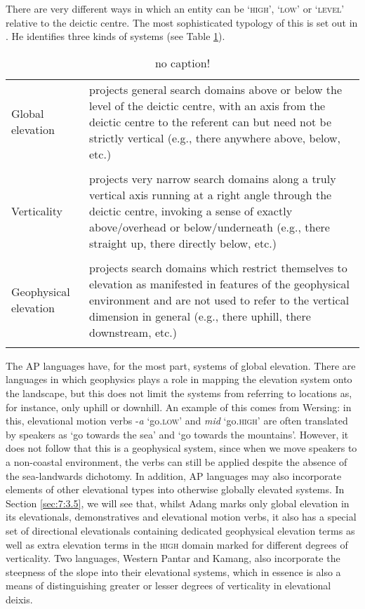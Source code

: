 \documentclass[output=paper]{LSP/langsci}
\begin{document}
There are very different ways in which an entity can be `\textsc{high}', `\textsc{low}' or `\textsc{level}' relative to the deictic centre. The most sophisticated typology of this is set out in \citet{Burenhult2008}. He identifies three kinds of systems \citep[110-111]{Burenhult2008} (see Table \ref{tab:7:1}).



\begin{table}
\begin{tabular}{p{2cm}p{8cm}}
\mytoprule
Global \newline elevation & projects general search domains above or below the level of the deictic centre, with an axis from the deictic centre to the referent can but need not be strictly vertical (e.g., there anywhere above, below, etc.)\\
\\
Verticality & projects very narrow search domains along a truly vertical axis running at a right angle through the deictic centre, invoking a sense of exactly above/overhead or below/underneath (e.g., there straight up, there directly below, etc.)\\
\\
Geophysical elevation & projects search domains which restrict themselves to elevation as manifested in features of the geophysical environment and are not used to refer to the vertical dimension in general (e.g., there uphill, there downstream, etc.)\\
\mybottomrule
\end{tabular}
\caption{no caption!}
\label{tab:7:1}
\end{table}

The AP languages have, for the most part, systems of global elevation. There are languages in which geophysics plays a role in mapping the elevation system onto the landscape, but this does not limit the systems from referring to locations as, for instance, only uphill or downhill. An example of this comes from Wersing: in this, elevational motion verbs -\textit{a} `go.\textsc{low'} and \textit{mid} `go.\textsc{high'} are often translated by speakers as `go towards the sea' and `go towards the mountains'. However, it does not follow that this is a geophysical system, since when we move speakers to a non-coastal environment, the verbs can still be applied despite the absence of the sea-landwards dichotomy. In addition, AP languages may also incorporate elements of {other elevational types into otherwise globally elevated systems. In Section \ref{sec:7:3.5}, we will see that, whilst Adang marks only global elevation in its elevationals, demonstratives and elevational motion verbs, it also has a special set of directional elevationals containing dedicated geophysical elevation terms as well as extra elevation terms in the} \textsc{high} {domain marked for different degrees of verticality. Two languages, Western Pantar and Kamang, also incorporate the steepness of the slope into their elevational systems, which in essence is also a means of distinguishing greater or lesser degrees of verticality in elevational deixis.}
\end{document}
